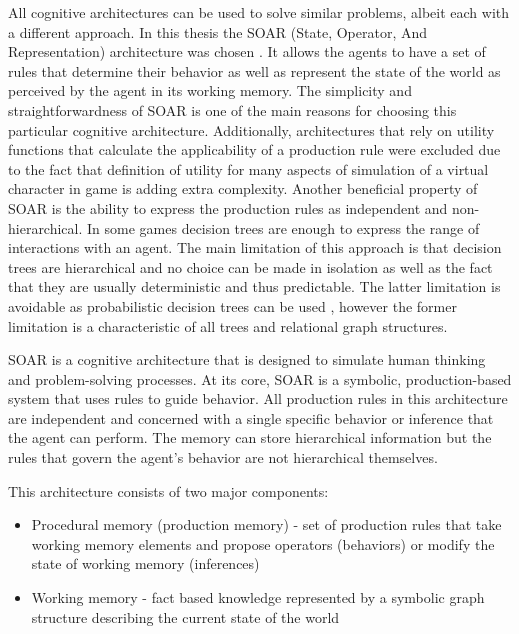 All cognitive architectures can be used to solve similar problems, albeit each with a different approach.
In this thesis the SOAR (State, Operator, And Representation) architecture was chosen \cite{laird2019soar}.
It allows the agents to have a set of rules that determine their behavior as well as represent the state of the world as perceived by the agent in its working memory.
The simplicity and straightforwardness of SOAR is one of the main reasons for choosing this particular cognitive architecture.
Additionally, architectures that rely on utility functions that calculate the applicability of a production rule were excluded due to the fact that definition of utility for many aspects of simulation of a virtual character in game is adding extra complexity.
Another beneficial property of SOAR is the ability to express the production rules as independent and non-hierarchical.
In some games decision trees are enough to express the range of interactions with an agent\cite{sweetser2002current}.
The main limitation of this approach is that decision trees are hierarchical and no choice can be made in isolation as well as the fact that they are usually deterministic and thus predictable.
The latter limitation is avoidable as probabilistic decision trees can be used \cite{saks1986probabilistic}, however the former limitation is a characteristic of all trees and relational graph structures.

SOAR is a cognitive architecture that is designed to simulate human thinking and problem-solving processes.
At its core, SOAR is a symbolic, production-based system that uses rules to guide behavior.
All production rules in this architecture are independent and concerned with a single specific behavior or inference that the agent can perform.
The memory can store hierarchical information but the rules that govern the agent's behavior are not hierarchical themselves.

This architecture consists of two major components:

\begin{itemize}
    \item Procedural memory (production memory) - set of production rules that take working memory elements and propose operators (behaviors) or modify the state of working memory (inferences)
    \item Working memory - fact based knowledge represented by a symbolic graph structure describing the current state of the world
\end{itemize}

